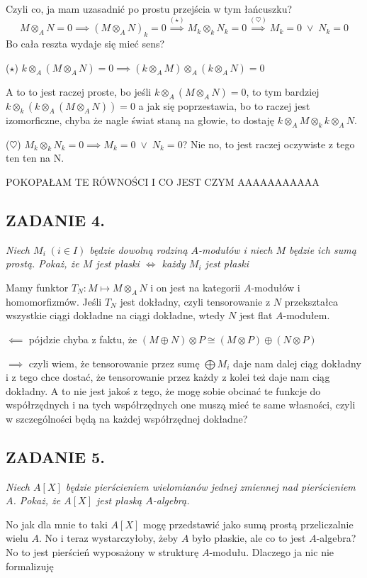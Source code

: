 \documentclass{article}
\begin{document}
Czyli co, ja mam uzasadnić po prostu przejścia w tym łańcuszku?
$$M\otimes_AN=0\implies(M\otimes_AN)_k=0\overset{(\star)}{\implies} M_k\otimes_kN_k=0\overset{(\heartsuit)}{\implies} M_k=0\;\lor\;N_k=0$$
Bo cała reszta wydaje się mieć sens?

($\star$) $k\otimes_A (M\otimes_AN)=0\implies(k\otimes_AM)\otimes_A(k\otimes_AN)=0$

A to to jest raczej proste, bo jeśli $k\otimes_A(M\otimes_AN)=0$, to tym bardziej $k\otimes_k(k\otimes_A(M\otimes_AN))=0$ a jak się poprzestawia, bo to raczej jest izomorficzne, chyba że nagle świat staną na głowie, to dostaję $k\otimes_AM\otimes_kk\otimes_AN$.

($\heartsuit$) $M_k\otimes_kN_k=0\implies M_k=0\;\lor\;N_k=0$? Nie no, to jest raczej oczywiste z tego ten ten na N.

{\color{orange}POKOPAŁAM TE RÓWNOŚCI I CO JEST CZYM AAAAAAAAAAA}

\subsection*{ZADANIE 4.}
\emph{\color{yellow}Niech $M_i\;(i\in I)$ będzie dowolną rodziną $A$-modułów i niech $M$ będzie ich sumą prostą. Pokaż, że $M$ jest płaski $\iff$ każdy $M_i$ jest płaski}
\smallskip

Mamy funktor $T_N:M\mapsto M\otimes_A N$ i on jest na kategorii $A$-modułów i homomorfizmów. Jeśli $T_N$ jest dokładny, czyli tensorowanie z $N$ przekształca wszystkie ciągi dokładne na ciągi dokładne, wtedy $N$ jest {\color{blue}flat} $A$-modułem.

$\impliedby$ pójdzie chyba z faktu, że $(M\oplus N)\otimes P\cong (M\otimes P)\oplus(N\otimes P)$

$\implies$ czyli wiem, że tensorowanie przez sumę $\bigoplus M_i$ daje nam dalej ciąg dokładny i z tego chce dostać, że tensorowanie przez każdy z kolei też daje nam ciąg dokładny. A to nie jest jakoś z tego, że mogę sobie obcinać te funkcje do współrzędnych i na tych współrzędnych one muszą mieć te same własności, czyli w szczególności będą na każdej współrzędnej dokładne?

\subsection*{ZADANIE 5.}
\emph{\color{yellow}Niech $A[X]$ będzie pierścieniem wielomianów jednej zmiennej nad pierścieniem $A$. Pokaż, że $A[X]$ jest płaską $A$-algebrą.}
\smallskip

No jak dla mnie to taki $A[X]$ mogę przedstawić jako sumą prostą przeliczalnie wielu $A$. No i teraz wystarczyłoby, żeby $A$ było płaskie, ale co to jest $A$-algebra?No to jest pierścień wyposażony w strukturę $A$-modułu. Dlaczego ja nic nie formalizuję
\end{document}
